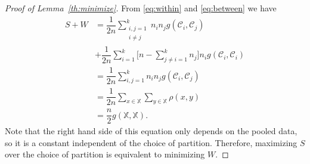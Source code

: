\documentclass{article}
\newcommand\C{{\mathcal{C}}}
\begin{document}
\begin{proof}[Proof of Lemma~\ref{th:minimize}]
From \eqref{eq:within} and \eqref{eq:between}
we have
\begin{equation}
\begin{split}
S + W &= 
\dfrac{1}{2n} \sum_{\substack{i,j=1 \\ i\ne j}}^k n_i n_j g(\C_i, \C_j)
\\&+ \dfrac{1}{2n} \sum_{i=1}^{k} 
\bigg[ n - 
\sum_{j\ne i = 1}^k n_j \bigg] 
n_i g(\C_i, \C_i) \\
& = \dfrac{1}{2n} \sum_{i,j=1}^k n_i n_j g(\C_i, \C_j) \\
&= \dfrac{1}{2n} \sum_{x \in \mathbb{X}} \sum_{y \in \mathbb{X}} \rho(x,y)\\
&= \dfrac{n}{2} g(\mathbb{X}, \mathbb{X}).
\end{split}
\end{equation}
Note that the right hand side of this equation 
only depends on the pooled data, so it is a constant
independent of the choice of partition. Therefore, maximizing
$S$ over the choice of partition is equivalent to minimizing $W$.
\end{proof}
\end{document}
